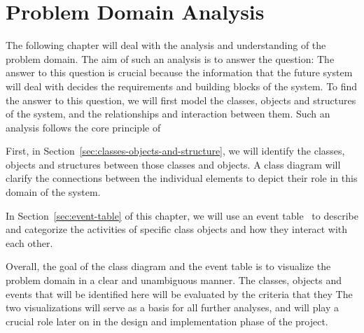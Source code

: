 \chapter{Problem Domain Analysis}\label{ch:problem-domain-analysis}

The following chapter will deal with the analysis and understanding of the problem domain.
The aim of such an analysis is to answer the question:
The answer to this question is crucial because the information that the future system will deal with decides the
requirements and building blocks of the system.
To find the answer to this question, we will first model the classes, objects and structures of the system, and the
relationships and interaction between them.
Such an analysis follows the core principle of

First, in Section~\ref{sec:classes-objects-and-structure}, we will identify the classes, objects and structures between
those classes and objects.
A class diagram will clarify the connections between the individual elements to depict their role in this domain of the
system.

In Section~\ref{sec:event-table} of this chapter, we will use an event table~\cite[52]{mathiassen2018} to describe and
categorize the activities of specific class objects and how they interact with each other.

Overall, the goal of the class diagram and the event table is to visualize the problem domain in a clear and unambiguous
manner.
The classes, objects and events that will be identified here will be evaluated by the criteria that they
The two visualizations will serve as a basis for all further analyses, and will play a crucial role later on in the
design and implementation phase of the project.



